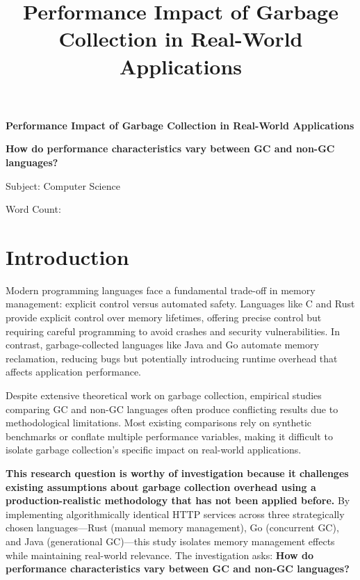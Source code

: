 \documentclass{article}
\title{Performance Impact of Garbage Collection in Real-World Applications}
\begin{document}
\begin{titlepage}
\centering
{\huge\bfseries Performance Impact of Garbage Collection in Real-World Applications\par}
\vspace{2cm}
{\large\bfseries How do performance characteristics vary between GC and non-GC languages?\par}
\vspace{1.5cm}
{\large Subject: Computer Science\par}
\vspace{1cm}
{\small Word Count: \par}
\end{titlepage}

\tableofcontents
\newpage

\section{Introduction}

Modern programming languages face a fundamental trade-off in memory management: explicit control versus automated safety. Languages like C and Rust provide explicit control over memory lifetimes, offering precise control but requiring careful programming to avoid crashes and security vulnerabilities. In contrast, garbage-collected languages like Java and Go automate memory reclamation, reducing bugs but potentially introducing runtime overhead that affects application performance.

Despite extensive theoretical work on garbage collection, empirical studies comparing GC and non-GC languages often produce conflicting results due to methodological limitations. Most existing comparisons rely on synthetic benchmarks or conflate multiple performance variables, making it difficult to isolate garbage collection's specific impact on real-world applications.

\textbf{This research question is worthy of investigation because it challenges existing assumptions about garbage collection overhead using a production-realistic methodology that has not been applied before.} By implementing algorithmically identical HTTP services across three strategically chosen languages—Rust (manual memory management), Go (concurrent GC), and Java (generational GC)—this study isolates memory management effects while maintaining real-world relevance. The investigation asks: \textbf{How do performance characteristics vary between GC and non-GC languages?}
\end{document}
